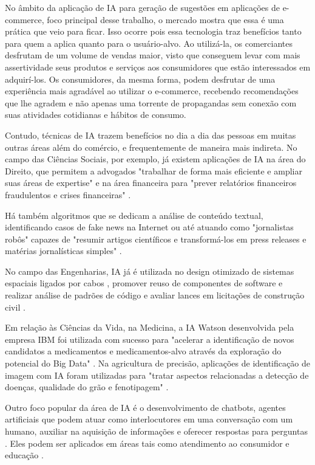 No âmbito da aplicação de IA para geração de sugestões em aplicações de e-commerce, foco principal desse trabalho, o mercado mostra que essa é uma prática que veio para ficar. Isso ocorre pois essa tecnologia traz benefícios tanto para quem a aplica quanto para o usuário-alvo. Ao utilizá-la, os comerciantes desfrutam de um volume de vendas maior, visto que conseguem levar com mais assertividade seus produtos e serviços aos consumidores que estão interessados em adquirí-los. Os consumidores, da mesma forma, podem desfrutar de uma experiência mais agradável ao utilizar o e-commerce, recebendo recomendações que lhe agradem e não apenas uma torrente de propagandas sem conexão com suas atividades cotidianas e hábitos de consumo.

Contudo, técnicas de IA trazem benefícios no dia a dia das pessoas em muitas outras áreas além do comércio, e frequentemente de maneira mais indireta. No campo das Ciências Sociais, por exemplo, já existem aplicações de IA na área do Direito, que permitem a advogados "trabalhar de forma mais eficiente e ampliar suas áreas de expertise" \cite{alaire18} e na área financeira para "prever relatórios financeiros fraudulentos e crises financeiras" \cite{clarence04}. 

Há também algoritmos que se dedicam a análise de conteúdo textual, identificando casos de fake news na Internet \cite{chitturi20} ou até atuando como "jornalistas robôs" capazes de "resumir artigos científicos e transformá-los em press releases e matérias jornalísticas simples" \cite{tatalovic18}.

No campo das Engenharias, IA já é utilizada no design otimizado de sistemas espaciais ligados por cabos \cite{chen19}, promover reuso de componentes de software e realizar análise de padrões de código \cite{wangoo18} e avaliar lances em licitações de construção civil \cite{sun11}.

Em relação às Ciências da Vida, na Medicina, a IA Watson desenvolvida pela empresa IBM foi utilizada com sucesso para "acelerar a identificação de novos candidatos a medicamentos e medicamentos-alvo através da exploração do potencial do Big Data" \cite{chen16}. Na agricultura de precisão, aplicações de identificação de imagem com IA foram utilizadas para "tratar aspectos relacionadas a detecção de doenças, qualidade do grão e fenotipagem" \cite{patricio18}. 

Outro foco popular da área de IA é o desenvolvimento de chatbots, agentes artificiais que podem atuar como interlocutores em uma conversação com um humano, auxiliar na aquisição de informações e oferecer respostas para perguntas \cite{wang18}. Eles podem ser aplicados em áreas tais como atendimento ao consumidor \cite{wessel20} e educação \cite{young19}.

